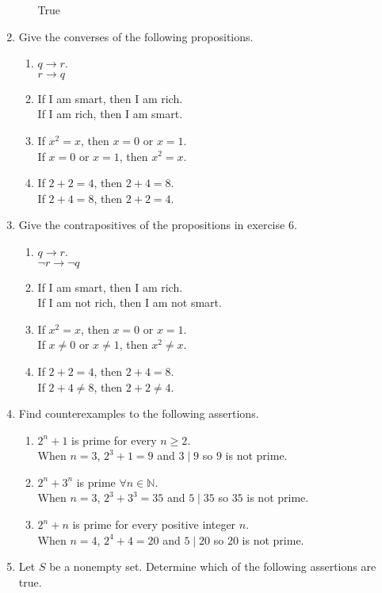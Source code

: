 \documentclass{article}
\newcommand{\N}{\mathbb{N}}
\begin{document}
\begin{enumerate}
\begin{enumerate}
	True
	\end{enumerate}
\setcounter{enumi}{5}
\item Give the converses of the following propositions.
	\begin{enumerate}
	\item $q\to r$.\\
	$r\to q$
	\item If I am smart, then I am rich.\\
	If I am rich, then I am smart.
	\item If $x^2=x$, then $x=0$ or $x=1$.\\
	If $x=0$ or $x=1$, then $x^2=x$.
	\item If $2+2=4$, then $2+4=8$.\\
	If $2+4=8$, then $2+2=4$.
	\end{enumerate}
\item Give the contrapositives of the propositions in exercise 6.
	\begin{enumerate}
	\item $q\to r$.\\
	$\neg r\to \neg q$
	\item If I am smart, then I am rich.\\
	If I am not rich, then I am not smart.
	\item If $x^2=x$, then $x=0$ or $x=1$.\\
	If $x\not=0$ or $x\not=1$, then $x^2\not=x$.
	\item If $2+2=4$, then $2+4=8$.\\
	If $2+4\not=8$, then $2+2\not=4$.
	\end{enumerate}
\setcounter{enumi}{11}
\item Find counterexamples to the following assertions.
	\begin{enumerate}
	\item $2^n+1$ is prime for every $n\geq2$.\\
	When $n=3$, $2^3+1=9$ and $3\mid9$ so $9$ is not prime.
	\item $2^n+3^n$ is prime $\forall n\in\N$.\\
	When $n=3$, $2^3+3^3=35$ and $5\mid35$ so $35$ is not prime. 
	\item $2^n+n$ is prime for every positive integer $n$.\\
	When $n=4$, $2^4+4=20$ and $5\mid20$ so $20$ is not prime.
	\end{enumerate}
\setcounter{enumi}{13}
\item Let $S$ be a nonempty set. Determine which of the following assertions are true.

\end{enumerate}
\end{document}
